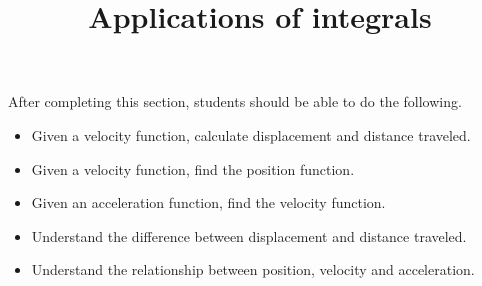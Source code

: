 \documentclass{ximera}
\title{Applications of integrals}
\begin{document}
\begin{abstract}
\end{abstract}

\maketitle

\begin{sectionOutcomes}

After completing this section, students should be able to do the following.

\begin{itemize}
	\item Given a velocity function, calculate displacement and distance traveled.
	\item Given a velocity function, find the position function.
	\item Given an acceleration function, find the velocity function.
	\item Understand the difference between displacement and distance traveled.
	\item Understand the relationship between position, velocity and acceleration.
\end{itemize}

\end{sectionOutcomes}
\end{document}
